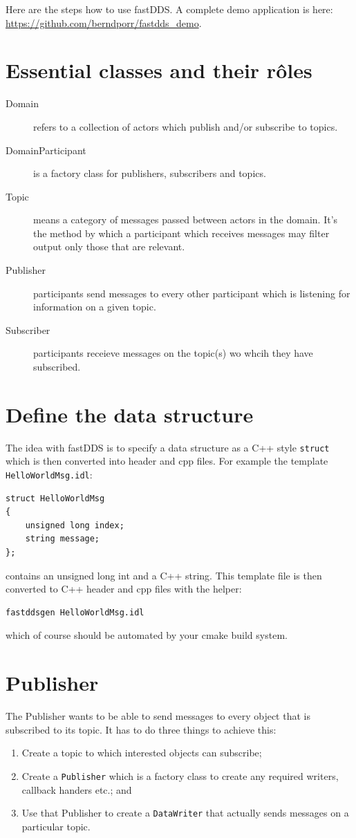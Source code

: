 \documentclass[12pt]{report}
\begin{document}
Here are the steps how to use fastDDS. A complete demo application is here: \url{https://github.com/berndporr/fastdds_demo}.

\section{Essential classes and their r\^oles}

\begin{description}
 \item[Domain] refers to a collection of actors which publish and/or subscribe to topics.
 \item[DomainParticipant] is a factory class for publishers, subscribers and topics.
 \item[Topic] means a category of messages passed between actors in the domain.
  It's the method by which a participant which receives messages may filter output
  only those that are relevant.
 \item[Publisher] participants send messages to every other participant
  which is listening for information on a given topic.
 \item[Subscriber] participants receieve messages on the topic(s) wo whcih they have
  subscribed.
\end{description}

\section{Define the data structure}

The idea with fastDDS is to specify a data structure as a C++ style
\texttt{struct} which is then converted into header and cpp files.
For example the template \texttt{HelloWorldMsg.idl}:
\begin{verbatim}
struct HelloWorldMsg
{
    unsigned long index;
    string message;
};
\end{verbatim}
contains an unsigned long int and a C++ string. This template file is then
converted to C++ header and cpp files with the helper:
\begin{verbatim}
fastddsgen HelloWorldMsg.idl
\end{verbatim}
which of course should be automated by your cmake build system.

\section{Publisher}
The Publisher wants to be able to send messages to every object that is
subscribed to its topic. It has to do three things to achieve this:
\begin{enumerate}
 \item Create a topic to which interested objects can subscribe;
 \item Create a \texttt{Publisher} which is a factory class to create any required
  writers, callback handers etc.; and
 \item Use that Publisher to create a \texttt{DataWriter} that actually
  sends messages on a particular topic.
\end{enumerate}
\end{document}
